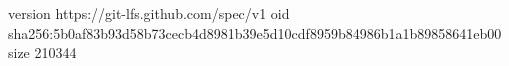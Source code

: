 version https://git-lfs.github.com/spec/v1
oid sha256:5b0af83b93d58b73cecb4d8981b39e5d10cdf8959b84986b1a1b89858641eb00
size 210344
